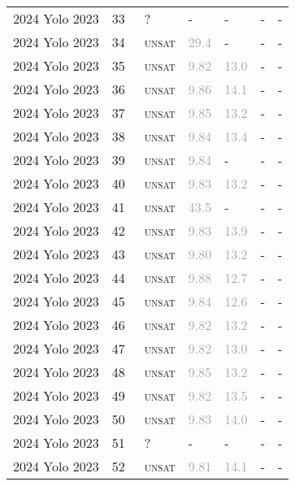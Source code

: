 \begin{center}
{\begin{longtable}{@{}lllllll@{}}
2024 Yolo 2023 & 33 & ~? & - & - & - & - \\
2024 Yolo 2023 & 34 & ~\textsc{unsat} & \textcolor{darkgray}{29.4} & - & - & - \\
2024 Yolo 2023 & 35 & ~\textsc{unsat} & \textcolor{darkgray}{9.82} & \textcolor{darkgray}{13.0} & - & - \\
2024 Yolo 2023 & 36 & ~\textsc{unsat} & \textcolor{darkgray}{9.86} & \textcolor{darkgray}{14.1} & - & - \\
2024 Yolo 2023 & 37 & ~\textsc{unsat} & \textcolor{darkgray}{9.85} & \textcolor{darkgray}{13.2} & - & - \\
2024 Yolo 2023 & 38 & ~\textsc{unsat} & \textcolor{darkgray}{9.84} & \textcolor{darkgray}{13.4} & - & - \\
2024 Yolo 2023 & 39 & ~\textsc{unsat} & \textcolor{darkgray}{9.84} & - & - & - \\
2024 Yolo 2023 & 40 & ~\textsc{unsat} & \textcolor{darkgray}{9.83} & \textcolor{darkgray}{13.2} & - & - \\
2024 Yolo 2023 & 41 & ~\textsc{unsat} & \textcolor{darkgray}{43.5} & - & - & - \\
2024 Yolo 2023 & 42 & ~\textsc{unsat} & \textcolor{darkgray}{9.83} & \textcolor{darkgray}{13.9} & - & - \\
2024 Yolo 2023 & 43 & ~\textsc{unsat} & \textcolor{darkgray}{9.80} & \textcolor{darkgray}{13.2} & - & - \\
2024 Yolo 2023 & 44 & ~\textsc{unsat} & \textcolor{darkgray}{9.88} & \textcolor{darkgray}{12.7} & - & - \\
2024 Yolo 2023 & 45 & ~\textsc{unsat} & \textcolor{darkgray}{9.84} & \textcolor{darkgray}{12.6} & - & - \\
2024 Yolo 2023 & 46 & ~\textsc{unsat} & \textcolor{darkgray}{9.82} & \textcolor{darkgray}{13.2} & - & - \\
2024 Yolo 2023 & 47 & ~\textsc{unsat} & \textcolor{darkgray}{9.82} & \textcolor{darkgray}{13.0} & - & - \\
2024 Yolo 2023 & 48 & ~\textsc{unsat} & \textcolor{darkgray}{9.85} & \textcolor{darkgray}{13.2} & - & - \\
2024 Yolo 2023 & 49 & ~\textsc{unsat} & \textcolor{darkgray}{9.82} & \textcolor{darkgray}{13.5} & - & - \\
2024 Yolo 2023 & 50 & ~\textsc{unsat} & \textcolor{darkgray}{9.83} & \textcolor{darkgray}{14.0} & - & - \\
2024 Yolo 2023 & 51 & ~? & - & - & - & - \\
2024 Yolo 2023 & 52 & ~\textsc{unsat} & \textcolor{darkgray}{9.81} & \textcolor{darkgray}{14.1} & - & - \\

\end{longtable}}
\end{center}
